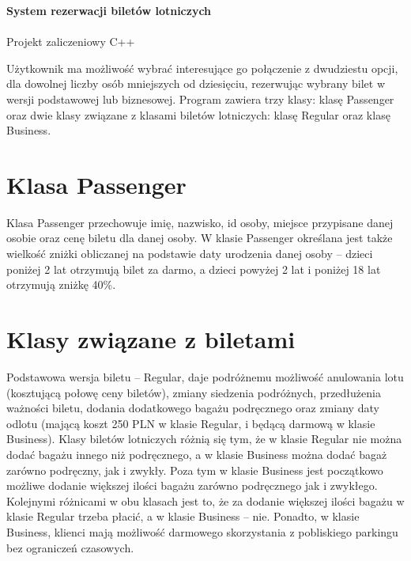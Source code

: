 \documentclass{article}
\begin{document}
\begin{center}\vspace{-1cm}
    \textbf{ \huge System rezerwacji biletów lotniczych}\\~\\
    \large Projekt zaliczeniowy C++\\
\end{center}



Użytkownik ma możliwość wybrać interesujące go połączenie z dwudziestu opcji,
dla dowolnej liczby osób mniejszych od dziesięciu, rezerwując wybrany bilet 
w wersji podstawowej lub biznesowej. Program zawiera trzy klasy: klasę Passenger oraz 
dwie klasy związane z klasami biletów 
lotniczych: klasę Regular oraz klasę Business.


\section*{Klasa Passenger}
Klasa Passenger przechowuje imię, nazwisko, id osoby, miejsce przypisane 
danej osobie oraz cenę biletu dla danej osoby. W klasie Passenger określana 
jest także wielkość zniżki obliczanej na podstawie daty urodzenia danej osoby –
dzieci poniżej 2 lat otrzymują bilet za darmo, a dzieci powyżej 2 lat i poniżej 
18 lat otrzymują zniżkę 40\%.

\section*{Klasy związane z biletami}
Podstawowa wersja biletu – Regular, daje podróżnemu możliwość anulowania lotu 
(kosztującą połowę ceny biletów), zmiany siedzenia podróżnych, przedłużenia 
ważności biletu, dodania dodatkowego bagażu podręcznego oraz zmiany daty odlotu 
(mającą koszt 250 PLN w klasie Regular, i będącą darmową w klasie Business).
Klasy biletów lotniczych 
różnią się tym, że w klasie Regular nie można dodać bagażu innego niż 
podręcznego, a w klasie Business można dodać bagaż zarówno podręczny, 
jak i zwykły. Poza tym w klasie Business jest początkowo możliwe dodanie większej 
ilości bagażu zarówno podręcznego jak i zwykłego. Kolejnymi różnicami w 
obu klasach jest to, że za dodanie większej ilości bagażu w klasie 
Regular trzeba płacić, a w klasie Business – nie. Ponadto, w klasie 
Business, klienci mają możliwość darmowego skorzystania z pobliskiego 
parkingu bez ograniczeń czasowych.
\end{document}
